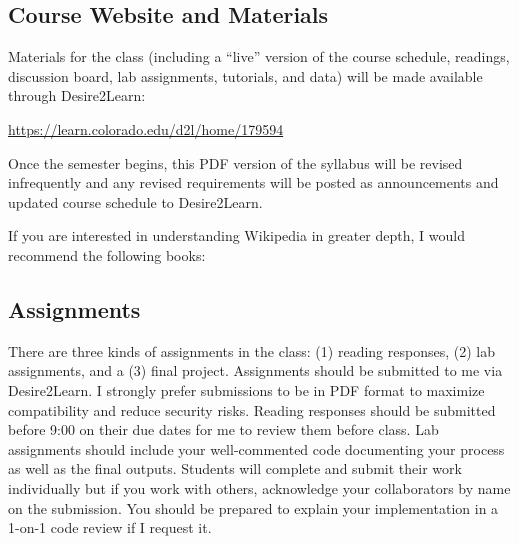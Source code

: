 \documentclass[11pt]{memoir}
\newenvironment{readinglist}{
\begin{list}{}{\leftmargin=8pt \itemindent=0em}
  \setlength{\itemsep}{8pt}
  \setlength{\parskip}{0em}
  \setlength{\parsep}{1em}
  \setlength{\parindent}{8em}}
{\end{list}}
\begin{document}
\subsection{Course Website and Materials}
Materials for the class (including a ``live'' version of the course schedule, readings, discussion board, lab assignments, tutorials, and data) will be made available through \mbox{Desire2Learn}:
\vspace{-8pt}
    \begin{center}
    \href{https://https://learn.colorado.edu/d2l/home/179594}{https://learn.colorado.edu/d2l/home/179594}
    \end{center}
\vspace{-8pt}
Once the semester begins, this PDF version of the syllabus will be revised infrequently and any revised requirements will be posted as announcements and updated course schedule to \mbox{Desire2Learn}.

If you are interested in understanding Wikipedia in greater depth, I would recommend the following books:

\begin{readinglist} 
    \item {}
    \item {}
    \item {}
    \item {}
    \item {}
\end{readinglist}

\subsection{Assignments}
There are three kinds of assignments in the class: (1) reading responses, (2) lab assignments, and a (3) final project. Assignments should be submitted to me via \mbox{Desire2Learn}. I strongly prefer submissions to be in PDF format to maximize compatibility and reduce security risks. Reading responses should be submitted before 9:00 on their due dates for me to review them before class. Lab assignments should include your well-commented code documenting your process as well as the final outputs. Students will complete and submit their work individually but if you work with others, acknowledge your collaborators by name on the submission. You should be prepared to explain your implementation in a 1-on-1 code review if I request it.
\end{document}
